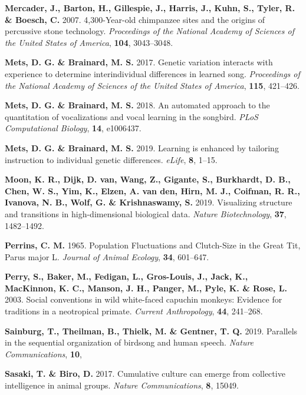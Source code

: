\documentclass[]{report}
\begin{document}
\leavevmode\hypertarget{ref-Mercader2007}{}%
\textbf{Mercader, J., Barton, H., Gillespie, J., Harris, J., Kuhn, S.,
Tyler, R. \& Boesch, C.} 2007. 4,300-Year-old chimpanzee sites and the
origins of percussive stone technology. \emph{Proceedings of the
National Academy of Sciences of the United States of America},
\textbf{104}, 3043--3048.

\leavevmode\hypertarget{ref-Mets2017}{}%
\textbf{Mets, D. G. \& Brainard, M. S.} 2017. Genetic variation
interacts with experience to determine interindividual differences in
learned song. \emph{Proceedings of the National Academy of Sciences of
the United States of America}, \textbf{115}, 421--426.

\leavevmode\hypertarget{ref-Mets2018}{}%
\textbf{Mets, D. G. \& Brainard, M. S.} 2018. An automated approach to
the quantitation of vocalizations and vocal learning in the songbird.
\emph{PLoS Computational Biology}, \textbf{14}, e1006437.

\leavevmode\hypertarget{ref-Mets2019}{}%
\textbf{Mets, D. G. \& Brainard, M. S.} 2019. Learning is enhanced by
tailoring instruction to individual genetic differences. \emph{eLife},
\textbf{8}, 1--15.

\leavevmode\hypertarget{ref-Moon2019}{}%
\textbf{Moon, K. R., Dijk, D. van, Wang, Z., Gigante, S., Burkhardt, D.
B., Chen, W. S., Yim, K., Elzen, A. van den, Hirn, M. J., Coifman, R.
R., Ivanova, N. B., Wolf, G. \& Krishnaswamy, S.} 2019. Visualizing
structure and transitions in high-dimensional biological data.
\emph{Nature Biotechnology}, \textbf{37}, 1482--1492.

\leavevmode\hypertarget{ref-Perrins1965}{}%
\textbf{Perrins, C. M.} 1965. Population Fluctuations and Clutch-Size in
the Great Tit, Parus major L. \emph{Journal of Animal Ecology},
\textbf{34}, 601--647.

\leavevmode\hypertarget{ref-Perry2003}{}%
\textbf{Perry, S., Baker, M., Fedigan, L., Gros-Louis, J., Jack, K.,
MacKinnon, K. C., Manson, J. H., Panger, M., Pyle, K. \& Rose, L.} 2003.
Social conventions in wild white-faced capuchin monkeys: Evidence for
traditions in a neotropical primate. \emph{Current Anthropology},
\textbf{44}, 241--268.

\leavevmode\hypertarget{ref-Sainburg2019b}{}%
\textbf{Sainburg, T., Theilman, B., Thielk, M. \& Gentner, T. Q.} 2019.
Parallels in the sequential organization of birdsong and human speech.
\emph{Nature Communications}, \textbf{10},

\leavevmode\hypertarget{ref-Sasaki2017a}{}%
\textbf{Sasaki, T. \& Biro, D.} 2017. Cumulative culture can emerge from
collective intelligence in animal groups. \emph{Nature Communications},
\textbf{8}, 15049.
\end{document}
